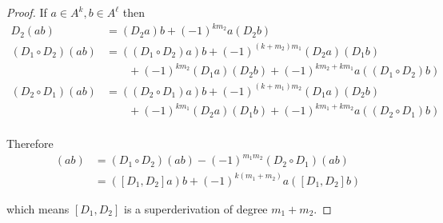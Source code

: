 \begin{proof}
	If \( a \in A^{k}, b \in A^{\ell} \) then
	\begingroup
	\allowdisplaybreaks%
	\begin{align*}
		D_{2}(ab)               & = (D_{2}a)b + {(-1)}^{km_{2}}a(D_{2}b)                                                      \\
		(D_{1} \circ D_{2})(ab) & = ((D_{1} \circ D_{2})a)b + {(-1)}^{(k + m_{2})m_{1}} (D_{2}a)(D_{1}b)                      \\
		                        & \qquad + {(-1)}^{km_{2}}(D_{1}a)(D_{2}b) + {(-1)}^{km_{2} + km_{1}} a((D_{1} \circ D_{2})b) \\
		(D_{2} \circ D_{1})(ab) & = ((D_{2} \circ D_{1})a)b + {(-1)}^{(k + m_{1})m_{2}}(D_{1}a)(D_{2}b)                       \\
		                        & \qquad + {(-1)}^{km_{1}}(D_{2}a)(D_{1}b) + {(-1)}^{km_{1} + km_{2}} a((D_{2} \circ D_{1})b) \\
	\end{align*}
	\endgroup

	Therefore
	\begingroup
	\allowdisplaybreaks%
	\begin{align*}
		[D_{1}, D_{2}](ab) & = (D_{1} \circ D_{2})(ab) - {(-1)}^{m_{1}m_{2}} (D_{2} \circ D_{1})(ab) \\
		                   & = {([D_{1}, D_{2}]a)b} + {(-1)}^{k(m_{1} + m_{2})} a{([D_{1}, D_{2}]b)}
	\end{align*}
	\endgroup

	which means \( [D_{1}, D_{2}] \) is a superderivation of degree \( m_{1} + m_{2} \).
\end{proof}
